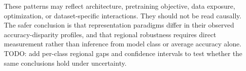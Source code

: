 These patterns may reflect architecture, pretraining objective, data exposure, optimization, or dataset-specific interactions. They should not be read causally. The safer conclusion is that representation paradigms differ in their observed accuracy-disparity profiles, and that regional robustness requires direct measurement rather than inference from model class or average accuracy alone. TODO: add per-class regional gaps and confidence intervals to test whether the same conclusions hold under uncertainty.
